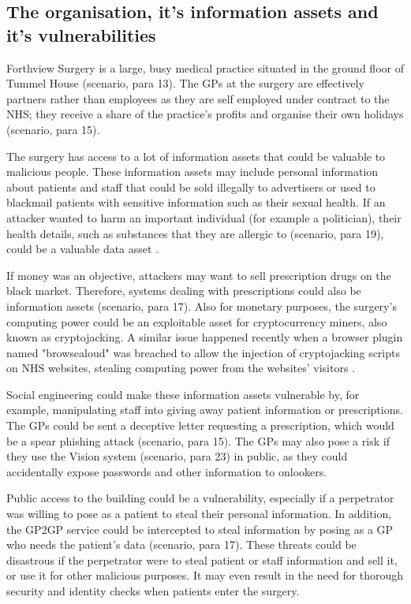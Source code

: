\documentclass[12pt,a4paper]{article}
\begin{document}
\subsection{The organisation, it's information assets and it's vulnerabilities}
Forthview Surgery is a large, busy medical practice situated in the ground floor of Tummel House (scenario, para 13). The GPs at the surgery are effectively partners rather than employees as they are self employed under contract to the NHS; they receive a share of the practice's profits and organise their own holidays (scenario, para 15). 

The surgery has access to a lot of information assets that could be valuable to malicious people. These information assets may include personal information about patients and staff that could be sold illegally to advertisers or used to blackmail patients with sensitive information such as their sexual health. If an attacker wanted to harm an important individual (for example a politician), their health details, such as substances that they are allergic to (scenario, para 19), could be a valuable data asset \cite{politician}. 

If money was an objective, attackers may want to sell prescription drugs on the black market. Therefore, systems dealing with prescriptions could also be information assets (scenario, para 17). Also for monetary purposes, the surgery's computing power could be an exploitable asset for cryptocurrency miners, also known as cryptojacking. A similar issue happened recently when a browser plugin named "browsealoud" was breached to allow the injection of cryptojacking scripts on NHS websites, stealing computing power from the websites' visitors \cite{cryptojacking}.

Social engineering could make these information assets vulnerable by, for example, manipulating staff into giving away patient information or prescriptions. The GPs could be sent a deceptive letter requesting a prescription, which would be a spear phishing attack (scenario, para 15). The GPs may also pose a risk if they use the Vision system (scenario, para 23) in public, as they could accidentally expose passwords and other information to onlookers.

Public access to the building could be a vulnerability, especially if a perpetrator was willing to pose as a patient to steal their personal information. In addition, the GP2GP service could be intercepted to steal information by posing as a GP who needs the patient's data (scenario, para 17). These threats could be disastrous if the perpetrator were to steal patient or staff information and sell it, or use it for other malicious purposes. It may even result in the need for thorough security and identity checks when patients enter the surgery.
\end{document}
